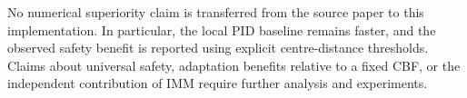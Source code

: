No numerical superiority claim is transferred from the source paper to this implementation. In particular, the local PID baseline remains faster, and the observed safety benefit is reported using explicit centre-distance thresholds. Claims about universal safety, adaptation benefits relative to a fixed CBF, or the independent contribution of IMM require further analysis and experiments.
